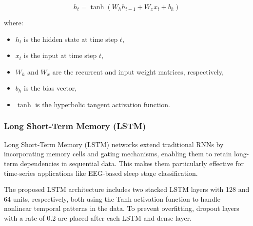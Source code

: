 \begin{equation}
	h_t = \tanh(W_h h_{t-1} + W_x x_t + b_h)
\end{equation}

\noindent where:
\begin{itemize}
	\item \( h_t \) is the hidden state at time step \( t \),
	\item \( x_t \) is the input at time step \( t \),
	\item \( W_h \) and \( W_x \) are the recurrent and input weight matrices, respectively,
	\item \( b_h \) is the bias vector,
	\item \( \tanh \) is the hyperbolic tangent activation function.
\end{itemize}



\subsubsection{Long Short-Term Memory (LSTM)}

Long Short-Term Memory (LSTM) networks extend traditional RNNs by incorporating memory cells and gating mechanisms, enabling them to retain long-term dependencies in sequential data. This makes them particularly effective for time-series applications like EEG-based sleep stage classification.

The proposed LSTM architecture includes two stacked LSTM layers with 128 and 64 units, respectively, both using the Tanh activation function to handle nonlinear temporal patterns in the data. To prevent overfitting, dropout layers with a rate of 0.2 are placed after each LSTM and dense layer.

